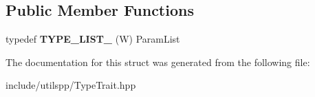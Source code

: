 \subsection*{Public Member Functions}
\begin{DoxyCompactItemize}
\item 
\hypertarget{structutilspp_1_1PointerOnFunction_3_01V_07_5_08_07W_08_4_a055c55de5f13eacd8d60d5b84c568791}{typedef {\bfseries T\-Y\-P\-E\-\_\-\-L\-I\-S\-T\-\_} (W) Param\-List}\label{structutilspp_1_1PointerOnFunction_3_01V_07_5_08_07W_08_4_a055c55de5f13eacd8d60d5b84c568791}

\end{DoxyCompactItemize}


The documentation for this struct was generated from the following file\-:\begin{DoxyCompactItemize}
\item 
include/utilspp/Type\-Trait.\-hpp\end{DoxyCompactItemize}
